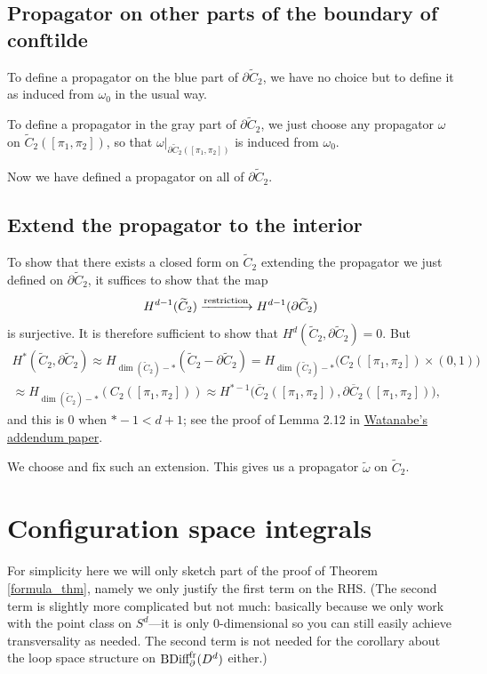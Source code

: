 \documentclass[11pt]{article}
\theoremstyle{definition}
\theoremstyle{remark}
\def\wt#1{\widetilde{#1}}
\def\ov#1{\overline{#1}}
\def\tn#1{\textnormal{#1}}
\begin{document}
\subsection{Propagator on other parts of the boundary of conftilde}

To define a propagator on the blue part of $\partial\wt{C}_2$, we have no choice but to define it as induced from $\omega_0$ in the usual way. 

To define a propagator in the gray part of $\partial\wt{C}_2$, we just choose any propagator $\omega$ on $\wt{C}_2([\pi_1,\pi_2])$, so that $\omega|_{\partial\wt{C}_2([\pi_1,\pi_2])}$ is induced from $\omega_0$. 

Now we have defined a propagator on all of $\partial\wt{C}_2$. 

\subsection{Extend the propagator to the interior}

To show that there exists a closed form on $\wt{C}_2$ extending the propagator we just defined on $\partial\wt{C}_2$, 
it suffices to show that the map 
$$H^{d-1}(\wt{C}_2)\xrightarrow{\tn{restriction}}H^{d-1}(\partial\wt{C}_2)$$
is surjective. 
It is therefore sufficient to show that $H^d(\wt{C}_2,\partial\wt{C}_2)=0$. But 
\begin{align*}
H^*(\wt{C}_2,\partial\wt{C}_2)\approx
H_{\dim(\wt{C}_2)-*}(\wt{C}_2-\partial\wt{C}_2)=
H_{\dim(\wt{C}_2)-*}\big(C_2([\pi_1,\pi_2])\times (0,1)\big)\\
\approx
H_{\dim(\wt{C}_2)-*}({C}_2([\pi_1,\pi_2]))
\approx H^{*-1}\big(\ov{C}_2([\pi_1,\pi_2]),\partial\ov{C}_2([\pi_1,\pi_2])\big), 
\end{align*}
and this is 0 when $*-1<d+1$; see the proof of Lemma 2.12 in \href{https://arxiv.org/pdf/2109.01609}{Watanabe's addendum paper}. 

We choose and fix such an extension. This gives us a propagator $\wt\omega$ on $\wt{C}_2$. 

\section{Configuration space integrals}

For simplicity here we will only sketch part of the proof of Theorem \ref{formula_thm}, namely we only justify the first term on the RHS. 
(The second term is slightly more complicated but not much: basically because we only work with the point class on $S^d$---it is only 0-dimensional so you can still easily achieve transversality as needed. The second term is not needed for the corollary about the loop space structure on $\tn{BDiff}^{\tn{fr}}_\partial(D^d)$ either.) 
\end{document}
